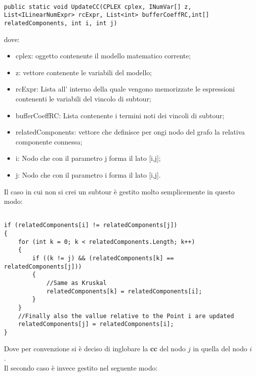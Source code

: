 \documentclass[11pt]{article}
\begin{document}
\begin{lstlisting}

public static void UpdateCC(CPLEX cplex, INumVar[] z, List<ILinearNumExpr> rcExpr, List<int> bufferCoeffRC,int[] relatedComponents, int i, int j)

\end{lstlisting}

dove:
\begin{itemize}
\item cplex: oggetto contenente il modello matematico corrente;
\item z: vettore contenente le variabili del modello;
\item rcExpr: Lista all' interno della quale vengono memorizzate le espressioni contenenti le variabili del vincolo di subtour;
\item bufferCoeffRC: Lista contenente i termini noti dei vincoli di subtour;
\item relatedComponents: vettore che definisce per ongi nodo del grafo la relativa componente connessa;
\item i: Nodo che con il parametro j forma il lato [i,j];
\item j: Nodo che con il parametro i forma il lato [i,j].
\end{itemize}

Il caso in cui non si crei un subtour è gestito molto semplicemente in questo modo:

\begin{lstlisting}

if (relatedComponents[i] != relatedComponents[j])
{
    for (int k = 0; k < relatedComponents.Length; k++)
    {
        if ((k != j) && (relatedComponents[k] == relatedComponents[j]))
        {
            //Same as Kruskal
            relatedComponents[k] = relatedComponents[i];
        }
    }
    //Finally also the vallue relative to the Point i are updated
    relatedComponents[j] = relatedComponents[i];
}

\end{lstlisting}

Dove per convenzione si è deciso di inglobare la \textbf{cc} del nodo $j$ in quella del nodo $i$.\\
Il secondo caso è invece gestito nel seguente modo:
\end{document}
